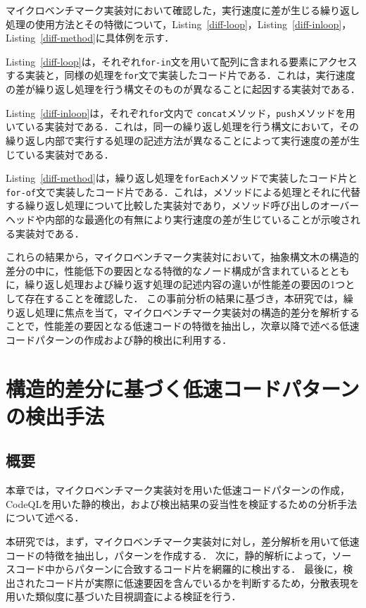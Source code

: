 \documentclass[11pt]{jreport}
\begin{document}
マイクロベンチマーク実装対において確認した，実行速度に差が生じる繰り返し処理の使用方法とその特徴について，Listing~\ref{diff-loop}，Listing~\ref{diff-inloop}，Listing~\ref{diff-method}に具体例を示す．

Listing~\ref{diff-loop}は，それぞれ\texttt{for-in}文を用いて配列に含まれる要素にアクセスする実装と，同様の処理を\texttt{for}文で実装したコード片である．これは，実行速度の差が繰り返し処理を行う構文そのものが異なることに起因する実装対である．

Listing~\ref{diff-inloop}は，それぞれ\texttt{for}文内で \texttt{concat}メソッド，\texttt{push}メソッドを用いている実装対である．これは，同一の繰り返し処理を行う構文において，その繰り返し内部で実行する処理の記述方法が異なることによって実行速度の差が生じている実装対である．

Listing~\ref{diff-method}は，繰り返し処理を\texttt{forEach}メソッドで実装したコード片と\texttt{for-of}文で実装したコード片である．これは，メソッドによる処理とそれに代替する繰り返し処理について比較した実装対であり，メソッド呼び出しのオーバーヘッドや内部的な最適化の有無により実行速度の差が生じていることが示唆される実装対である．

これらの結果から，マイクロベンチマーク実装対において，抽象構文木の構造的差分の中に，性能低下の要因となる特徴的なノード構成が含まれているとともに，繰り返し処理および繰り返す処理の記述内容の違いが性能差の要因の1つとして存在することを確認した．
この事前分析の結果に基づき，本研究では，繰り返し処理に焦点を当て，マイクロベンチマーク実装対の構造的差分を解析することで，性能差の要因となる低速コードの特徴を抽出し，次章以降で述べる低速コードパターンの作成および静的検出に利用する．


\chapter{構造的差分に基づく低速コードパターンの検出手法}
\label{chap:approach}

\section{概要}
\label{sec:approach_abst}

本章では，マイクロベンチマーク実装対を用いた低速コードパターンの作成，CodeQLを用いた静的検出，および検出結果の妥当性を検証するための分析手法について述べる．

本研究では，まず，マイクロベンチマーク実装対に対し，差分解析を用いて低速コードの特徴を抽出し，パターンを作成する．
次に，静的解析によって，ソースコード中からパターンに合致するコード片を網羅的に検出する．
最後に，検出されたコード片が実際に低速要因を含んでいるかを判断するため，分散表現を用いた類似度に基づいた目視調査による検証を行う．
\end{document}
